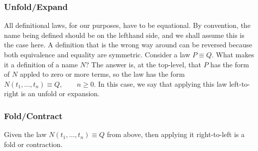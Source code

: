 \subsubsection*{Unfold/Expand}

All definitional laws, for our purposes, have to be equational.
By convention, the name being defined should be on the lefthand side,
and we shall assume this is the case here.
A definition that is the wrong way around can be reversed because both
equivalence and equality are symmetric.
Consider a law $P \equiv Q$. What makes it a definition of a name $N$?
The answer is, 
at the top-level,
that $P$ has the form of $N$ appled to zero or more terms, 
so the law has the form
$N(t_1,\dots,t_n) \equiv Q, \qquad n \geq 0$.
In this case, we say that applying this law left-to-right
is an unfold or expansion.

\subsubsection*{Fold/Contract}

Given the law $N(t_1,\dots,t_n) \equiv Q$ from above,
then applying it right-to-left is a fold or contraction.